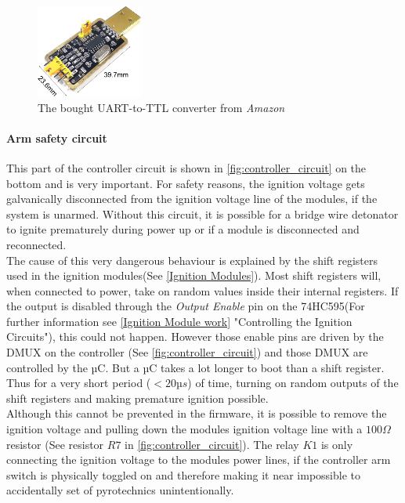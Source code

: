 \begin{figure}[!ht]
    \centering
    \includegraphics[width=3.5cm]{./Figures/uart_ttl.jpg}
    \caption{The bought UART-to-TTL converter from \textit{Amazon}}
    \label{fig:uart_ttl}     
\end{figure}


\pagebreak

\paragraph{Arm safety circuit}
This part of the controller circuit is shown in \cref{fig:controller_circuit} on the bottom and is very important. For safety reasons, the ignition voltage gets galvanically disconnected from the ignition voltage line of the modules, if the system is unarmed. Without this circuit, it is possible for a bridge wire detonator to ignite prematurely during power up or if a module is disconnected and reconnected. \\

\noindent The cause of this very dangerous behaviour is explained by the shift registers used in the ignition modules(See \cref{Ignition Modules}). Most shift registers will, when connected to power, take on random values inside their internal registers. If the output is disabled through the \textit{Output Enable} pin on the 74HC595(For further information see \cref{Ignition Module work} "Controlling the Ignition Circuits"), this could not happen. However those enable pins are driven by the DMUX on the controller (See \cref{fig:controller_circuit}) and those DMUX are controlled by the µC. But a µC takes a lot longer to boot than a shift register. Thus for a very short period ($<20µs$) of time, turning on random outputs of the shift registers and making premature ignition possible.\\

\noindent Although this cannot be prevented in the firmware, it is possible to remove the ignition voltage and pulling down the modules ignition voltage line with a $100\Omega$ resistor (See resistor $R7$ in \cref{fig:controller_circuit}). The relay $K1$ is only connecting the ignition voltage to the modules power lines, if the controller arm switch is physically toggled on and therefore making it near impossible to accidentally set of pyrotechnics unintentionally.

